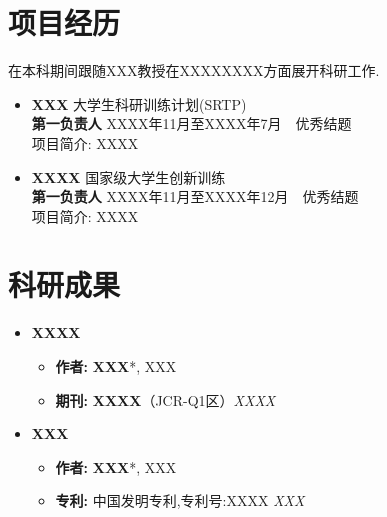   \section{\makebox[\widthof{\faChalkboardTeacher}][c]{\color{CQU_Blue}{\faChalkboardTeacher}}\quad 项目经历}
	\vspace{0.5em}
	在本科期间跟随XXX教授在XXXXXXXX方面展开科研工作.
	\begin{itemize}[noitemsep, topsep=3pt]
		\item {\large{\textbf{XXX}}} \hfill {大学生科研训练计划(SRTP)}\\
		\textbf{第一负责人} \hfill {XXXX年11月至XXXX年7月\ \ 优秀结题}\\
		
		项目简介: XXXX
		\vspace{3.5em}
		\item {\large{\textbf{XXXX}}} \hfill {国家级大学生创新训练}\\
		\textbf{第一负责人} \hfill {XXXX年11月至XXXX年12月\ \ 优秀结题}\\
		
		项目简介: XXXX
		
		
	\end{itemize}



    \section{\makebox[\widthof{\faGraduationCap}][c]{\color{CQU_Blue}{\faGraduationCap}}\quad 科研成果}
	

\begin{itemize}[noitemsep, topsep=3pt]
	\item \textbf{XXXX}
	\begin{itemize}[label={}, leftmargin=*, topsep=0pt]
		\item \textbf{作者:} \textbf{XXX}*, XXX
		\item \textbf{期刊:} \textbf{XXXX}（JCR-Q1区）\hfill \textit{XXXX\ }
	\end{itemize}
	\vspace{3.5em}
	\item \textbf{XXX}
	\begin{itemize}[label={}, leftmargin=*, topsep=0pt]
		\item \textbf{作者:} \textbf{XXX}*, XXX
		\item \textbf{专利:} 中国发明专利,专利号:XXXX \hfill \textit{XXX\ }
	\end{itemize}
\end{itemize}


